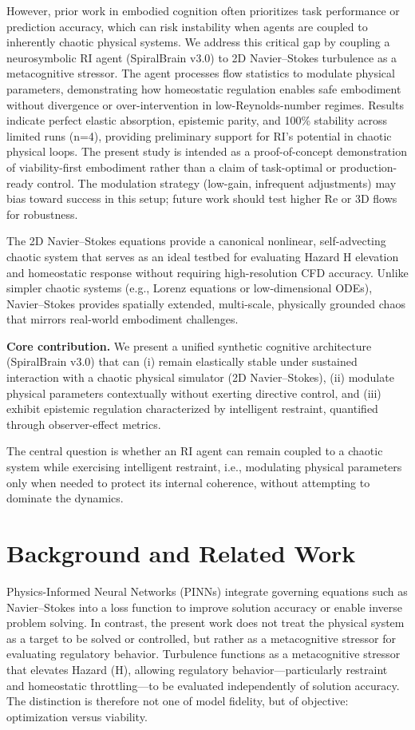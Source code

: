 \documentclass[12pt,a4paper]{article}
\begin{document}
However, prior work in embodied cognition often prioritizes task performance or prediction accuracy, which can risk instability when agents are coupled to inherently chaotic physical systems. We address this critical gap by coupling a neurosymbolic RI agent (SpiralBrain v3.0) to 2D Navier--Stokes turbulence as a metacognitive stressor. The agent processes flow statistics to modulate physical parameters, demonstrating how homeostatic regulation enables safe embodiment without divergence or over-intervention in low-Reynolds-number regimes. Results indicate perfect elastic absorption, epistemic parity, and 100\% stability across limited runs (n=4), providing preliminary support for RI's potential in chaotic physical loops. The present study is intended as a proof-of-concept demonstration of viability-first embodiment rather than a claim of task-optimal or production-ready control. The modulation strategy (low-gain, infrequent adjustments) may bias toward success in this setup; future work should test higher Re or 3D flows for robustness.

The 2D Navier--Stokes equations provide a canonical nonlinear, self-advecting chaotic system that serves as an ideal testbed for evaluating Hazard H elevation and homeostatic response without requiring high-resolution CFD accuracy. Unlike simpler chaotic systems (e.g., Lorenz equations or low-dimensional ODEs), Navier--Stokes provides spatially extended, multi-scale, physically grounded chaos that mirrors real-world embodiment challenges.

\textbf{Core contribution.} We present a unified synthetic cognitive architecture (SpiralBrain v3.0) that can (i) remain elastically stable under sustained interaction with a chaotic physical simulator (2D Navier--Stokes), (ii) modulate physical parameters contextually without exerting directive control, and (iii) exhibit epistemic regulation characterized by intelligent restraint, quantified through observer-effect metrics.

The central question is whether an RI agent can remain coupled to a chaotic system while exercising intelligent restraint, i.e., modulating physical parameters only when needed to protect its internal coherence, without attempting to dominate the dynamics.

\section{Background and Related Work}

Physics-Informed Neural Networks (PINNs) \cite{Raissi2019} integrate governing equations such as Navier--Stokes into a loss function to improve solution accuracy or enable inverse problem solving. In contrast, the present work does not treat the physical system as a target to be solved or controlled, but rather as a metacognitive stressor for evaluating regulatory behavior. Turbulence functions as a metacognitive stressor that elevates Hazard (H), allowing regulatory behavior—particularly restraint and homeostatic throttling—to be evaluated independently of solution accuracy. The distinction is therefore not one of model fidelity, but of objective: optimization versus viability.
\end{document}
